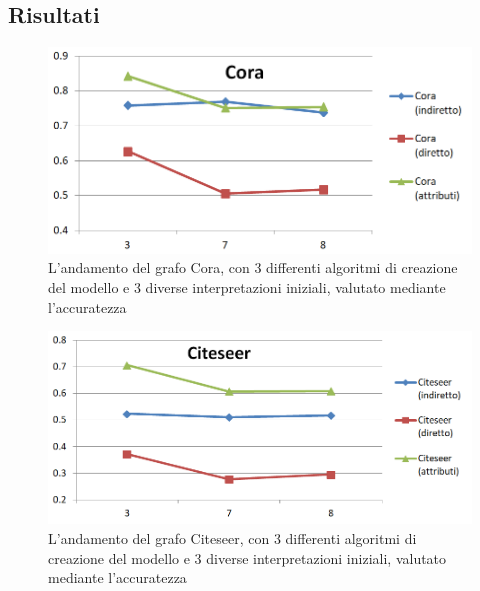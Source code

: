 \subsection{Risultati}
%
\begin{figure}[htp]
	\centering
	\includegraphics[width=\linewidth]{immagini/VC_cora}
	\caption{L'andamento del grafo Cora, con 3 differenti algoritmi di creazione del modello e 3 diverse interpretazioni iniziali, valutato mediante l'accuratezza}
	\label{fig:LP_CN}
\end{figure}
%
\begin{figure}[htp]
	\centering
	\includegraphics[width=\linewidth]{immagini/VC_citeseer}
	\caption{L'andamento del grafo Citeseer, con 3 differenti algoritmi di creazione del modello e 3 diverse interpretazioni iniziali, valutato mediante l'accuratezza}
	\label{fig:LP_Dolphins}
\end{figure}
%

%
%
%
